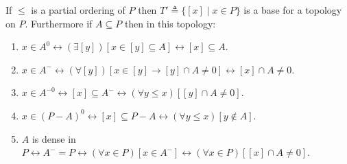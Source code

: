 If $\leq$ is a partial ordering of $P$ then $T' \triangleq \{[x] \mid x \in P\}$ is a base for a topology on $P$. Furthermore if $A \subseteq P$ then in this topology:
\begin{enumerate}
\item $x \in A^0 \leftrightarrow (\exists [y])[x \in [y] \subseteq A] \leftrightarrow [x] \subseteq A$.
\item $x \in A^- \leftrightarrow (\forall [y])[x \in [y] \rightarrow [y] \cap A \neq 0] \leftrightarrow [x] \cap A \neq 0$.
\item $x \in A^{-0} \leftrightarrow [x] \subseteq A^- \leftrightarrow (\forall y \leq x)[[y] \cap A \neq 0]$.
\item $x \in (P - A)^0 \leftrightarrow [x] \subseteq P - A \leftrightarrow (\forall y \leq x)[y \notin A]$.
\item $A$ is dense in $P \leftrightarrow A^- = P \leftrightarrow (\forall x \in P)[x \in A^-] \leftrightarrow (\forall x \in P)[[x] \cap A \neq 0]$.
\end{enumerate}
